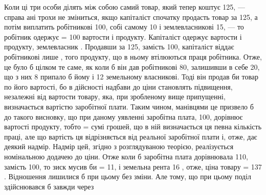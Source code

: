 Коли ці три особи ділять між собою самий товар, який тепер коштує
125, — справа ані трохи не зміниться, якщо капіталіст спочатку продасть
товар за 125, а потім виплатить робітникові 100, собі самому 10 і землевласникові
15, — то робітник одержує  = 100 вартости і продукту. Капіталіст
одержує  вартости і продукту, землевласник . Продавши за 125, замість
100, капіталіст віддає робітникові лише , того продукту, що в ньому втілюються
праця робітника. Отже, це було б цілком те саме, як коли б він дав
робітникові 80, залишивши в себе 20, що з них 8 припало б йому і 12 земельному
власникові. Тоді він продав би товар по його вартості, бо в дійсності
надбави до ціни становлять підвищення, незалежні від вартости товару, яка, при
зробленому вище припущенні, визначається вартістю заробітної плати. Таким
чином, манівцями це призвело б до такого висновку, що при даному уявленні
заробітна плата, 100, дорівнює вартості продукту, тобто = сумі грошей, що в
ній визначається ця певна кількість праці, але що вартість ця відрізняється від
реальної заробітної плати і, отже, дає деякий надмір. Надмір цей, згідно з розглядуваною
теорією, реалізується номінальною додачею до ціни. Отже коли б
заробітна плата дорівнювала 110, замість 100, то зиск мусив би = 11, і земельна
рента 16 , отже, ціна товару = 137 . Відношення лишилися б при
цьому без зміни. Але тому, що при цьому поділ здійснювався б завжди через
\parbreak{}  %

